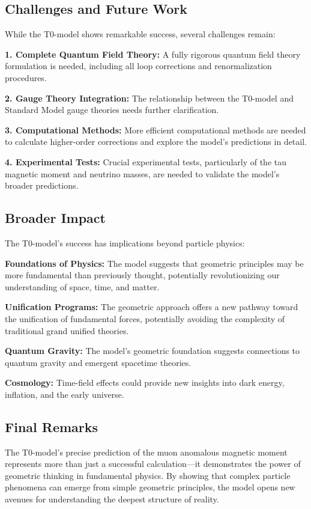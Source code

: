 \documentclass[12pt,a4paper]{article}
\begin{document}
	\subsection{Challenges and Future Work}
	
	While the T0-model shows remarkable success, several challenges remain:
	
	\textbf{1. Complete Quantum Field Theory:}
	A fully rigorous quantum field theory formulation is needed, including all loop corrections and renormalization procedures.
	
	\textbf{2. Gauge Theory Integration:}
	The relationship between the T0-model and Standard Model gauge theories needs further clarification.
	
	\textbf{3. Computational Methods:}
	More efficient computational methods are needed to calculate higher-order corrections and explore the model's predictions in detail.
	
	\textbf{4. Experimental Tests:}
	Crucial experimental tests, particularly of the tau magnetic moment and neutrino masses, are needed to validate the model's broader predictions.
	
	\subsection{Broader Impact}
	
	The T0-model's success has implications beyond particle physics:
	
	\textbf{Foundations of Physics:}
	The model suggests that geometric principles may be more fundamental than previously thought, potentially revolutionizing our understanding of space, time, and matter.
	
	\textbf{Unification Programs:}
	The geometric approach offers a new pathway toward the unification of fundamental forces, potentially avoiding the complexity of traditional grand unified theories.
	
	\textbf{Quantum Gravity:}
	The model's geometric foundation suggests connections to quantum gravity and emergent spacetime theories.
	
	\textbf{Cosmology:}
	Time-field effects could provide new insights into dark energy, inflation, and the early universe.
	
	\subsection{Final Remarks}
	
	The T0-model's precise prediction of the muon anomalous magnetic moment represents more than just a successful calculation—it demonstrates the power of geometric thinking in fundamental physics. By showing that complex particle phenomena can emerge from simple geometric principles, the model opens new avenues for understanding the deepest structure of reality.
	
\end{document}
